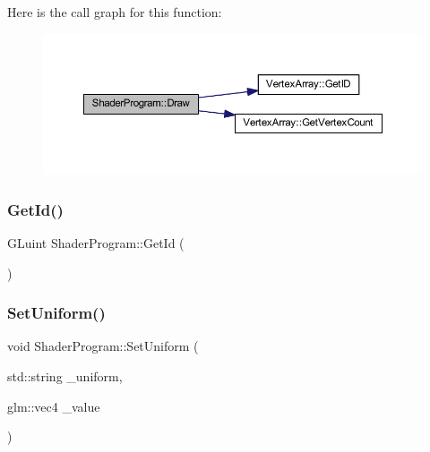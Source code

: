 Here is the call graph for this function\+:
\nopagebreak
\begin{figure}[H]
\begin{center}
\leavevmode
\includegraphics[width=350pt]{class_shader_program_aca655dd6fd3034c99d01b7627789087f_cgraph}
\end{center}
\end{figure}
\mbox{\label{class_shader_program_a5b2653f0b69e26a9b867b1a7a3aec2ef}} 
\subsubsection{\texorpdfstring{Get\+Id()}{GetId()}}
{\footnotesize\ttfamily G\+Luint Shader\+Program\+::\+Get\+Id (\begin{DoxyParamCaption}{ }\end{DoxyParamCaption})\hspace{0.3cm}{\ttfamily [inline]}}

\mbox{\label{class_shader_program_a415d4a54caef8913771ebce26478291c}} 
\subsubsection{\texorpdfstring{Set\+Uniform()}{SetUniform()}\hspace{0.1cm}{\footnotesize\ttfamily [1/3]}}
{\footnotesize\ttfamily void Shader\+Program\+::\+Set\+Uniform (\begin{DoxyParamCaption}\item[{std\+::string}]{\+\_\+uniform,  }\item[{glm\+::vec4}]{\+\_\+value }\end{DoxyParamCaption})}

